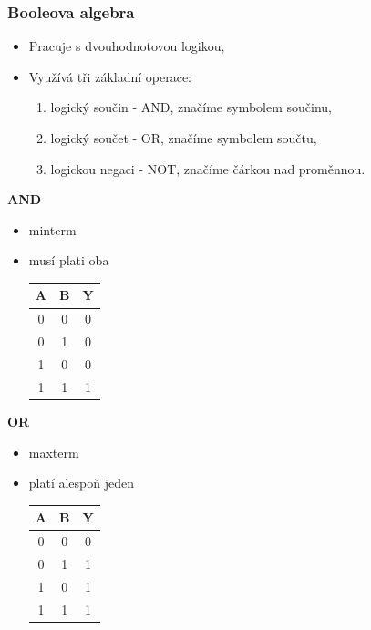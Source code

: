 	\begin{frame}
    \frametitle{Booleova algebra}
		\boldmath
		
		
		\begin{itemize}
			\item Pracuje s dvouhodnotovou logikou,
			\item Využívá tři základní operace:
			
			\begin{enumerate}
				\item logický součin - AND, značíme symbolem součinu,
				\item logický součet - OR, značíme symbolem součtu,
				\item logickou negaci - NOT, značíme čárkou nad proměnnou.
			\end{enumerate}
			
		\end{itemize}
		\vspace{5mm}
		
		\begin{minipage}[t][0.4\textheight][t]{0.32\textwidth}
      \textbf{AND}
			
			\begin{itemize}
				\item minterm
				\item musí plati oba
			
      
				\begin{tabular}{ c c | c}
					A & B & Y \\
					\hline
					0 & 0 & 0 \\
					0 & 1 & 0 \\
					1 & 0 & 0 \\
					1 & 1 & 1 \\
				\end{tabular}
			\end{itemize}
      
		\end{minipage}
		\begin{minipage}[t][0.4\textheight][t]{0.4\textwidth}
      \textbf{OR}
			
			\begin{itemize}
				\item maxterm
				\item platí alespoň jeden
      
				\begin{tabular}{ c c | c}
					A & B & Y \\
					\hline
					0 & 0 & 0 \\
					0 & 1 & 1 \\
					1 & 0 & 1 \\
					1 & 1 & 1 \\
				\end{tabular}
			\end{itemize}
      

\end{minipage}
\end{frame}
